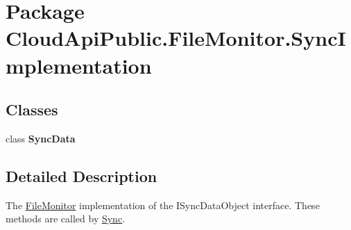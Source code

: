 \hypertarget{namespace_cloud_api_public_1_1_file_monitor_1_1_sync_implementation}{\section{Package Cloud\-Api\-Public.\-File\-Monitor.\-Sync\-Implementation}
\label{namespace_cloud_api_public_1_1_file_monitor_1_1_sync_implementation}
}
\subsection*{Classes}
\begin{DoxyCompactItemize}
\item 
class {\bfseries Sync\-Data}
\end{DoxyCompactItemize}


\subsection{Detailed Description}
The \hyperlink{namespace_cloud_api_public_1_1_file_monitor}{File\-Monitor} implementation of the I\-Sync\-Data\-Object interface. These methods are called by \hyperlink{namespace_cloud_api_public_1_1_sync}{Sync}. 